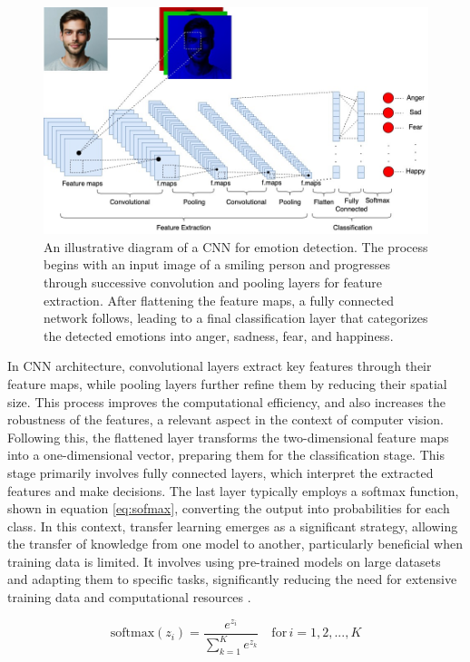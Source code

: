 \documentclass[runningheads]{llncs}
\begin{document}
\begin{figure}[htb]
\centering
\includegraphics[width=0.97\linewidth]{CNNArchitecture.jpg}
\caption{An illustrative diagram of a CNN for emotion detection. The process begins with an input image of a smiling person and progresses through successive convolution and pooling layers for feature extraction. After flattening the feature maps, a fully connected network follows, leading to a final classification layer that categorizes the detected emotions into anger, sadness, fear, and happiness.}
\label{fig:cnnarchitecture}
\end{figure}

In CNN architecture, convolutional layers extract key features through their feature maps, while pooling layers further refine them by reducing their spatial size. This process improves the computational efficiency, and also increases the robustness of the features, a relevant aspect in the context of computer vision. Following this, the flattened layer transforms the two-dimensional feature maps into a one-dimensional vector, preparing them for the classification stage. This stage primarily involves fully connected layers, which interpret the extracted features and make decisions. The last layer typically employs a softmax function, shown in equation \ref{eq:sofmax}, converting the output into probabilities for each class. In this context, transfer learning emerges as a significant strategy, allowing the transfer of knowledge from one model to another, particularly beneficial when training data is limited. It involves using pre-trained models on large datasets and adapting them to specific tasks, significantly reducing the need for extensive training data and computational resources \cite{Khan2020}.

\begin{equation}
\text{softmax}(z_i) = \frac{e^{z_i}}{\sum_{k=1}^{K} e^{z_k}} \quad \text{for} \, i = 1, 2, ..., K
\label{eq:sofmax}
\end{equation}
\end{document}
